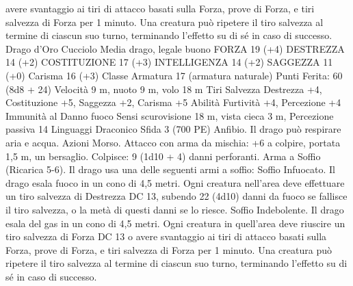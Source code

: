 \begin{multicols}{2}
avere svantaggio ai tiri di attacco basati sulla Forza, prove di Forza, e
tiri salvezza di Forza per 1 minuto. Una creatura può ripetere il tiro
salvezza al termine di ciascun suo turno, terminando l’effetto su di sé
in caso di successo.
Drago d’Oro Cucciolo
Media drago, legale buono
FORZA 19 (+4)
DESTREZZA 14 (+2)
COSTITUZIONE 17 (+3)
INTELLIGENZA 14 (+2)
SAGGEZZA 11 (+0)
Carisma 16 (+3)
Classe Armatura 17 (armatura naturale)
\hspace*{0pt}\hfill{Punti Ferita}: 60 (8d8 + 24)
Velocità 9 m, nuoto 9 m, volo 18 m
Tiri Salvezza Destrezza +4, Costituzione +5, Saggezza +2,
Carisma +5
Abilità Furtività +4, Percezione +4
Immunità al Danno fuoco
Sensi scurovisione 18 m, vista cieca 3 m, Percezione passiva 14
Linguaggi Draconico
Sfida 3 (700 PE)
Anfibio. Il drago può respirare aria e acqua.
Azioni
Morso. Attacco con arma da mischia: +6 a colpire, portata 1,5
m, un bersaglio.
Colpisce: 9 (1d10 + 4) danni perforanti.
Arma a Soffio (Ricarica 5-6). Il drago usa una delle seguenti armi
a soffio:
Soffio Infuocato. Il drago esala fuoco in un cono di 4,5 metri. Ogni
creatura nell’area deve effettuare un tiro salvezza di Destrezza DC
13, subendo 22 (4d10) danni da fuoco se fallisce il tiro salvezza, o la
metà di questi danni se lo riesce.
Soffio Indebolente. Il drago esala del gas in un cono di 4,5 metri.
Ogni creatura in quell’area deve riuscire un tiro salvezza di Forza DC
13 o avere svantaggio ai tiri di attacco basati sulla Forza, prove di
Forza, e tiri salvezza di Forza per 1 minuto. Una creatura può ripetere
il tiro salvezza al termine di ciascun suo turno, terminando l’effetto
su di sé in caso di successo.
 

\end{multicols}
